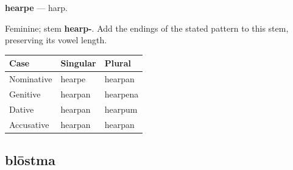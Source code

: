 \par\begin{minipage}{\linewidth}\raggedright
\textbf{hearpe} — harp.

Feminine; stem \textbf{hearp-}. Add the endings of the stated pattern to this stem, preserving its vowel length.

\par\begingroup
\fontsize{10.5}{13.2}\selectfont
\setlength{\LTleft}{0pt}\setlength{\LTright}{\fill}
\noindent
\begin{tabular}{@{}>{\raggedright\arraybackslash}p{39.46mm}>{\raggedright\arraybackslash}p{39.46mm}>{\raggedright\arraybackslash}p{39.46mm}@{}}
\toprule
\textbf{Case} & \textbf{Singular} & \textbf{Plural} \\
\midrule
Nominative & hearpe & hearpan \\
Genitive & hearpan & hearpena \\
Dative & hearpan & hearpum \\
Accusative & hearpan & hearpan \\
\bottomrule
\end{tabular}
\par\endgroup

\end{minipage}\par
{}
\subsection*{blōstma}

